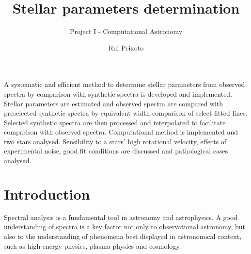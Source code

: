 \documentclass{aa}
\begin{document}
 



   \title{Stellar parameters determination}

   
   \subtitle{Project I - Computational Astronomy}

   \author{Rui Peixoto}



 
  \abstract
   {}
   {A systematic and efficient method to determine stellar parameters from observed spectra by
     comparison with synthetic spectra is developed and implemented.}
   {Stellar parameters are estimated and observed spectra are compared with
     preselected synthetic spectra by equivalent width comparison of select fitted
     lines. Selected synthetic spectra are then processed and
     interpolated to facilitate comparison with observed spectra.}
   {Computational method is implemented and two stars analysed. Sensibility to a
     stars' high rotational velocity, effects of experimental noise, good fit
     conditions are discussed and pathological cases analysed.}
   {}


   \maketitle
%

\section{Introduction}

Spectral analysis is a fundamental tool in astronomy and
astrophysics. A good understanding of spectra is a key factor not only to
observational astronomy, but also to the understanding of phenomena best
displayed in astronomical context, such as high-energy physics, plasma physics and cosmology.
\end{document}
